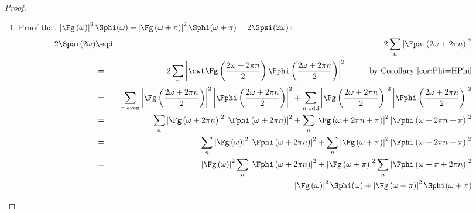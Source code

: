 \begin{proof}
\begin{enumerate}
\item Proof that
   $
   \left|\Fg\left(\omega\right)\right|^2\Sphi(\omega) +
   \left|\Fg\left(\omega+\pi \right)\right|^2 \Sphi(\omega+\pi)
   = 2\Spsi(2\omega)
   $:
\begin{eqnarray*}
   2\Spsi(2\omega)
     &\eqd& 2\sum_n \left|\Fpsi(2\omega+2\pi n)\right|^2
   \\&=& 2\sum_n \left|\cwt \Fg\left(\frac{2\omega+2\pi n}{2}\right)\Fphi\left(\frac{2\omega+2\pi n}{2}\right)\right|^2
         \hspace{1cm}\text{by Corollary~\ref{cor:Phi=HPhi}}
   \\&=& \sum_{n\;\mathrm{even}} \left|\Fg\left(\frac{2\omega+2\pi n}{2}\right)\right|^2\left|\Fphi\left(\frac{2\omega+2\pi n}{2}\right)\right|^2 +
         \sum_{n\;\mathrm{odd} } \left|\Fg\left(\frac{2\omega+2\pi n}{2}\right)\right|^2\left|\Fphi\left(\frac{2\omega+2\pi n}{2}\right)\right|^2
   \\&=& \sum_n \left|\Fg\left(\omega+2\pi n\right)          \right|^2\left|\Fphi\left(\omega+2\pi n\right)\right|^2 +
         \sum_n \left|\Fg\left(\omega+2\pi n+\pi \right)\right|^2\left|\Fphi\left(\omega+2\pi n + \pi \right)\right|^2
   \\&=& \sum_n \left|\Fg\left(\omega     \right)\right|^2\left|\Fphi\left(\omega+2\pi n\right)\right|^2 +
         \sum_n \left|\Fg\left(\omega+\pi \right)\right|^2\left|\Fphi\left(\omega+2\pi n + \pi \right)\right|^2
   \\&=& \left|\Fg\left(\omega\right)\right|^2\sum_n \left|\Fphi\left(\omega+2\pi n\right)\right|^2 +
         \left|\Fg\left(\omega+\pi \right)\right|^2\sum_n \left|\Fphi\left(\omega+\pi+2\pi n\right)\right|^2
   \\&=& \left|\Fg\left(\omega\right)\right|^2\Sphi(\omega) +
         \left|\Fg\left(\omega+\pi \right)\right|^2 \Sphi(\omega+\pi)
\end{eqnarray*}



\end{enumerate}
\end{proof}
